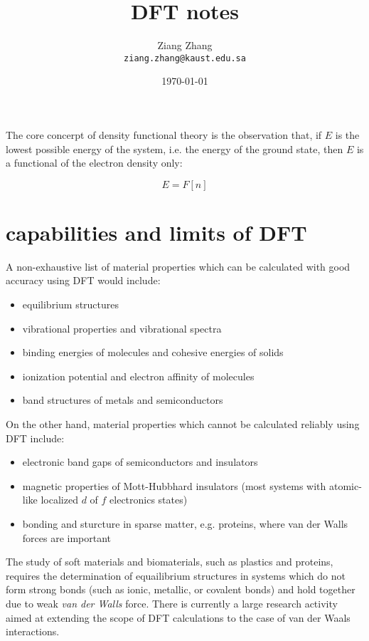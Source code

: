 \documentclass[a4paper, 11pt]{article}
\title{DFT notes}
\author{Ziang Zhang \\ \texttt{ziang.zhang@kaust.edu.sa}}
\date{\today}
\numberwithin{equation}{subsection}
\begin{document}
\maketitle
\tableofcontents

The core concerpt of density functional theory is the observation that, if $E$ is the lowest possible energy of the system, i.e. the energy of the ground state, then $E$ is a functional of the electron density only:

\begin{equation}
  E = F[n]
\end{equation}

\section{capabilities and limits of DFT}

A non-exhaustive list of material properties which can be calculated with good accuracy using DFT would include:

\begin{itemize}
  \item equilibrium structures
  \item vibrational properties and vibrational spectra
  \item binding energies of molecules and cohesive energies of solids
  \item ionization potential and electron affinity of molecules
  \item band structures of metals and semiconductors
\end{itemize}

On the other hand, material properties which cannot be calculated reliably using DFT include:

\begin{itemize}
  \item electronic band gaps of semiconductors and insulators
  \item magnetic properties of Mott-Hubbhard insulators (most systems with atomic-like localized $d$ of $f$ electronics states)
  \item bonding and sturcture in sparse matter, e.g. proteins, where van der Walls forces are important
\end{itemize}

The study of soft materials and biomaterials, such as plastics and proteins, requires the determination of equailibrium structures in systems which do not form strong bonds (such as ionic, metallic, or covalent bonds) and hold together due to weak \textit{van der Walls} force. There is currently a large research activity aimed at extending the scope of DFT calculations to the case of van der Waals interactions.
\end{document}
